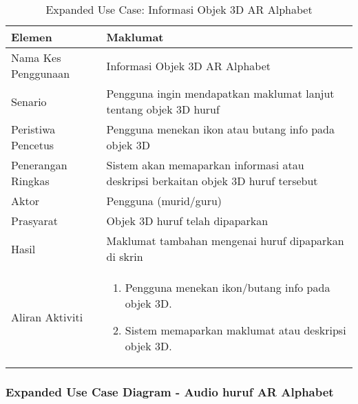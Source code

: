 \begin{itemize}
\begin{itemize}
\begin{itemize}
\begin{itemize}
\begin{itemize}
\begin{itemize}
\begin{itemize}
\begin{itemize}
\begin{table}[htbp]
\centering
\caption{Expanded Use Case: Informasi Objek 3D AR Alphabet}
\begin{tabular}{lp{10cm}}
\toprule
\textbf{Elemen} & \textbf{Maklumat} \\
\midrule
Nama Kes Penggunaan & Informasi Objek 3D AR Alphabet \\
Senario & Pengguna ingin mendapatkan maklumat lanjut tentang objek 3D huruf \\
Peristiwa Pencetus & Pengguna menekan ikon atau butang info pada objek 3D \\
Penerangan Ringkas & Sistem akan memaparkan informasi atau deskripsi berkaitan objek 3D huruf tersebut \\
Aktor & Pengguna (murid/guru) \\
Prasyarat & Objek 3D huruf telah dipaparkan \\
Hasil & Maklumat tambahan mengenai huruf dipaparkan di skrin \\
Aliran Aktiviti & 
\begin{enumerate}
    \item Pengguna menekan ikon/butang info pada objek 3D.
    \item Sistem memaparkan maklumat atau deskripsi objek 3D.
\end{enumerate} \\
\bottomrule
\end{tabular}
\label{jadual:expanded_info_ar_alphabet}
\end{table}




\subsubsection{ Expanded Use Case Diagram - Audio huruf AR Alphabet}



\end{itemize}
\end{itemize}
\end{itemize}
\end{itemize}
\end{itemize}
\end{itemize}
\end{itemize}
\end{itemize}
